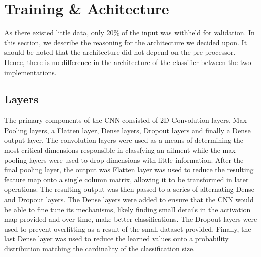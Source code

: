 \documentclass[12pt]{report}
\begin{document}
\section{Training \& Achitecture}
As there existed little data, only 20\% of the input was withheld for validation.
In this section, we describe the reasoning for the architecture we decided upon.
It should be noted that the architecture did not depend on the pre-processor.
Hence, there is no difference in the architecture of the classifier between the two implementations.

\subsection{Layers}
The primary components of the CNN consisted of 2D Convolution layers,
Max Pooling layers, a Flatten layer, Dense layers, Dropout layers and finally a Dense output layer.
The convolution layers were used as a means of determining the most critical dimensions
responsible in classfying an ailment while the max pooling layers were used to drop
dimensions with little information. After the final pooling layer, the output was
Flatten layer was used to reduce the resulting feature map onto a single column matrix, allowing it to be
transformed in later operations.
The resulting output was then passed to a series of alternating
Dense and Dropout layers. The Dense layers were added to ensure
that the CNN would  be able to fine tune its mechanisms, likely finding small details in the activation map provided
and over time, make better classifications. The Dropout layers were used to prevent overfitting
as a result of the small dataset provided. Finally, the last Dense layer was used to reduce
the learned values onto a probability distribution matching the cardinality of the classification size.
\end{document}
